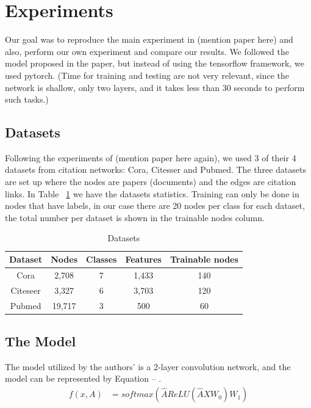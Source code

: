 \section{Experiments}
Our goal was to reproduce the main experiment in (mention paper here) and also, perform our own experiment and compare our results. We followed the model proposed in the paper, but instead of using the tensorflow framework, we used pytorch. (Time for training and testing are not very relevant, since the network is shallow, only two layers, and it takes less than 30 seconds to perform such tasks.) 

\subsection{Datasets}

Following the experiments of (mention paper here again), we used 3 of their 4 datasets from citation networks: Cora, Citesser and Pubmed. The three datasets are set up where the nodes are papers (documents) and the edges are citation links. In Table ~\ref{tab:datasets} we have the datasets statistics. Training can only be done in nodes that have labels, in our case there are 20 nodes per class for each dataset, the total number per dataset is shown in the trainable nodes column.

\begin {table}[ht]
\caption {Datasets} \label{tab:datasets} 
  \begin{center}
    \begin{tabular}{|c|c|c|c|c|}
    \hline
    Dataset  & Nodes  & Classes & Features & Trainable nodes\\
    \hline 
    Cora     & 2,708  & 7       & 1,433    & 140 \\ 
    Citeseer & 3,327  & 6       & 3,703    & 120  \\  
    Pubmed   & 19,717 & 3       & 500      & 60   \\
    \hline
    \end{tabular}
  \end{center}
\end{table}

\subsection{The Model}
The model utilized by the authors' is a 2-layer convolution network, and the model can be represented by Equation -- .
\begin{align*}
    f(x,A) &= softmax(\hat{A}ReLU(\hat{A}XW_{0})W_{1})
\end{align*}


